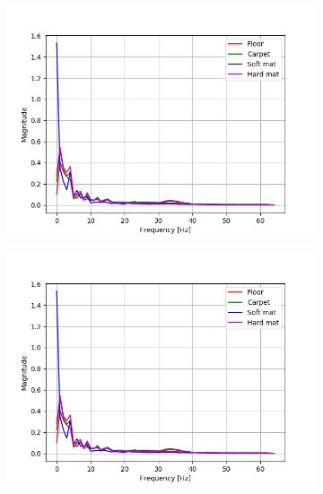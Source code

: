 \documentclass[USenglish]{ifimaster}  %
\begin{document}
\begin{figure}[h]
	\begin{subfigure}{0.5\linewidth}
		\centering
		\includegraphics[scale=0.4]{Figures/fftx}
		\caption{}
		\label{fig:sub1}
	\end{subfigure}%
	\begin{subfigure}{.5\linewidth}
		\centering
		\includegraphics[scale=0.4]{Figures/fftx}
		\caption{}
		\label{fig:sub2}
	\end{subfigure}\\[1ex]
	\begin{subfigure}{\linewidth}
		\centering

\end{subfigure}
\end{figure}
\end{document}
